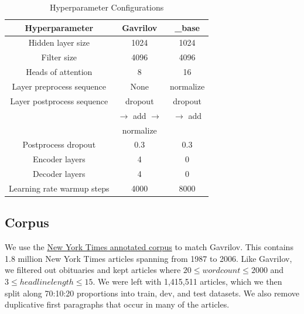 \documentclass[11pt]{article}
\begin{document}
\begin{table}[h!]
\centering
\begin{small}
\begin{tabular}{|c |c |c|} 
 \hline
 Hyperparameter & Gavrilov & \_base \\ [0.5ex] 
 \hline
 Hidden layer size & 1024 & 1024 \\ 
 Filter size & 4096 & 4096 \\
 Heads of attention & 8 & 16 \\
 Layer preprocess sequence & None & normalize \\
 Layer postprocess sequence & dropout & dropout \\
 & $\rightarrow$ add $\rightarrow$ & $\rightarrow$ add \\
 & normalize & \\
 Postprocess dropout & 0.3 & 0.3 \\
 Encoder layers & 4 & 0 \\
 Decoder layers & 4 & 0 \\
 Learning rate warmup steps & 4000 & 8000 \\ [1ex]
 \hline
\end{tabular}
\end{small}
\caption{Hyperparameter Configurations}
\label{table:hparams}
\end{table}

\subsection{Corpus}
We use the \href{https://catalog.ldc.upenn.edu/LDC2008T19}{New York Times annotated corpus} to match Gavrilov. This contains 1.8 million New York Times articles spanning from 1987 to 2006. Like Gavrilov, we filtered out obituaries and kept articles where $20 \le wordcount \le 2000$ and $3 \le headline length \le 15$. We were left with 1,415,511 articles, which we then split along 70:10:20 proportions into train, dev, and test datasets. We also remove duplicative first paragraphs that occur in many of the articles. 
\end{document}
